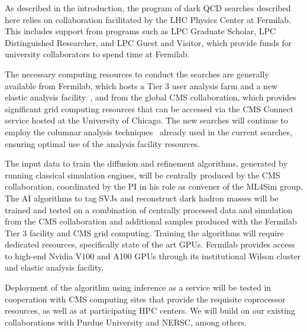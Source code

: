 As described in the introduction, the program of dark QCD searches described here relies
on collaboration facilitated by the LHC Physics Center at Fermilab.
This includes support from programs such as LPC Graduate Scholar, LPC Distinguished Researcher, and LPC Guest and Visitor,
which provide funds for university collaborators to spend time at Fermilab.

The necessary computing resources to conduct the searches are generally available from Fermilab,
which hosts a Tier 3 user analysis farm and a new elastic analysis facility~\cite{Savard:2023wwi,Benjamin:2022dpo,Flechas:2022uug},
and from the global CMS collaboration, which provides significant grid computing resources that can be accessed via the CMS Connect service hosted at the University of Chicago.
The new searches will continue to employ the columnar analysis techniques~\cite{Smith:2020pxs} already used in the current searches,
ensuring optimal use of the analysis facility resources.

The input data to train the diffusion and refinement algorithms, generated by running classical simulation engines,
will be centrally produced by the CMS collaboration, coordinated by the PI in his role as convener of the ML4Sim group.
The AI algorithms to tag SVJs and reconstruct dark hadron masses will be trained and tested on a combination of centrally processed data and simulation from the CMS collaboration
and additional samples produced with the Fermilab Tier 3 facility and CMS grid computing.
Training the algorithms will require dedicated resources, specifically state of the art GPUs.
Fermilab provides access to high-end Nvidia V100 and A100 GPUs through its institutional Wilson cluster and elastic analysis facility.

Deployment of the algorithm using inference as a service will be tested in cooperation with CMS computing sites that provide the requisite coprocessor resources,
as well as at participating HPC centers.
We will build on our existing collaborations with Purdue University and NERSC, among others.

